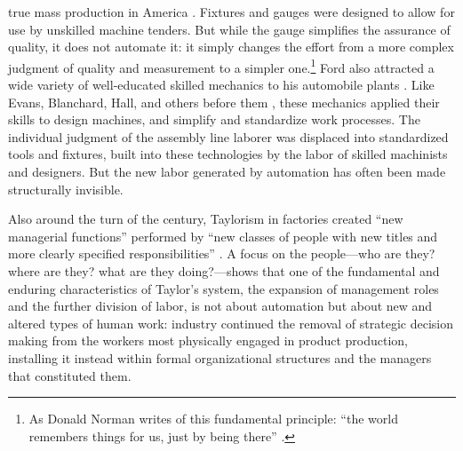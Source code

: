true mass production in America \cite[p. 217]{hounshell}. Fixtures
and gauges were designed to allow for use by unskilled machine
tenders.
 But while the gauge simplifies the
assurance  of quality, it does not
automate it:  it simply changes the effort from a more complex judgment
of quality and measurement to a simpler one.\footnote{As Donald
Norman writes of this fundamental principle: ``the world remembers things for us, just by being
there'' \cite[p. 147]{normanThings}.} Ford also attracted a wide
variety of well-educated skilled mechanics 
to his automobile plants \cite[p. 223]{hounshell}. Like Evans, Blanchard, Hall, and others
before them \cite{roesmithHarpers}, these mechanics applied their skills to design machines,
and simplify and standardize work processes. The individual judgment
of the assembly line laborer was displaced into standardized tools and
fixtures, built into these technologies by the labor of skilled
machinists and designers. But the new labor generated by automation
has often
been made structurally invisible.


Also around the turn of the century, Taylorism in factories created ``new managerial
functions'' performed by ``new classes of people with new titles and
more clearly specified responsibilities'' \cite[p. 120]{aitken}. A focus on the
people---who are they? where are they? what are they doing?---shows that
one of the fundamental and enduring characteristics of Taylor's
system, the expansion of management roles and the further division of
labor, is not about automation but about new and altered
types of human work: industry continued
the removal of strategic decision making from the
workers most physically engaged in product production, installing it
instead within formal organizational structures and the managers that
constituted them. 



